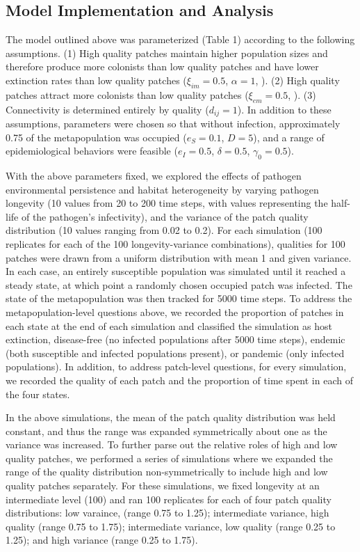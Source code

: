 \documentclass{svjour3}
\begin{document}
\subsection{Model Implementation and Analysis}

The model outlined above was parameterized (Table 1) according to the following assumptions. (1) High quality patches maintain higher population sizes and therefore produce more colonists than low quality patches and have lower extinction rates than low quality patches ($\xi_{im}=0.5$, $\alpha=1$, \cite{Hanski2003}).  (2) High quality patches attract more colonists than low quality patches ($\xi_{em}=0.5$, \cite{Hanski2003}).  (3)  Connectivity is determined entirely by quality ($d_{ij}=1$).  In addition to these assumptions, parameters were chosen so that without infection, approximately 0.75 of the metapopulation was occupied ($e_S = 0.1$, $D=5$), and a range of epidemiological behaviors were feasible ($e_I = 0.5$, $\delta = 0.5$, $\gamma_0 = 0.5$). 

With the above parameters fixed, we explored the effects of pathogen environmental persistence and habitat heterogeneity by varying pathogen longevity (10 values from 20 to 200 time steps, with values representing the half-life of the pathogen's infectivity), and the variance of the patch quality distribution (10 values ranging from 0.02 to 0.2).  For each simulation (100 replicates for each of the 100 longevity-variance combinations), qualities for 100 patches were drawn from a uniform distribution with mean 1 and given variance. In each case, an entirely susceptible population was simulated until it reached a steady state, at which point a randomly chosen occupied patch was infected.  The state of the metapopulation was then tracked for 5000 time steps.  To address the metapopulation-level questions above, we recorded the proportion of patches in each state at the end of each simulation and classified the simulation as host extinction, disease-free (no infected populations after 5000 time steps), endemic (both susceptible and infected populations present), or pandemic (only infected populations).  In addition, to address patch-level questions, for every simulation, we recorded the quality of each patch and the proportion of time spent in each of the four states.  

In the above simulations, the mean of the patch quality distribution was held constant, and thus the range was expanded symmetrically about one as the variance was increased.  To further parse out the relative roles of high and low quality patches, we performed a series of simulations where we expanded the range of the quality distribution non-symmetrically to include high and low quality patches separately.  For these simulations, we fixed longevity at an intermediate level (100) and ran 100 replicates for each of four patch quality distributions: low varaince, (range 0.75 to 1.25); intermediate variance, high quality (range 0.75 to 1.75); intermediate variance, low quality (range 0.25 to 1.25); and high variance (range 0.25 to 1.75).
\end{document}
